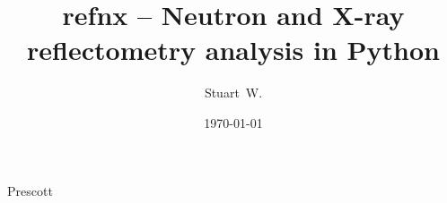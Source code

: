 \documentclass[pdf,preprint]{iucr}
\begin{document}
\title{refnx -- Neutron and X-ray reflectometry analysis in Python}
\author[b]{Stuart~W.}{Prescott}


\date{\today}

\newcommand{\refnx}{\emph{refnx}}
\newcommand{\Objective}{\textbf{Objective}}
\newcommand{\GlobalObjective}{\textbf{GlobalObjective}}
\newcommand{\Parameter}{\textbf{Parameter}}
\newcommand{\Structure}{\textbf{Structure}}
\newcommand{\Slab}{\textbf{Slab}}
\newcommand{\Component}{\textbf{Component}}
\newcommand{\LipidLeaflet}{\textbf{LipidLeaflet}}
\newcommand{\Transform}{\textbf{Transform}}
\newcommand{\DataD}{\textbf{Data1D}}
\newcommand{\ReflectModel}{\textbf{ReflectModel}}
\newcommand{\CurveFitter}{\textbf{CurveFitter}}
\newcommand{\Spline}{\textbf{Spline}}
\newcommand{\conda}{\emph{conda}}
\newcommand{\corner}{\emph{corner}}
\newcommand{\MixedReflectModel}{\textbf{MixedReflectModel}}
\newcommand{\pip}{\emph{pip}}
\newcommand{\emcee}{\emph{emcee}}
\newcommand{\ptemcee}{\emph{ptemcee}}
\newcommand{\NumPy}{\emph{NumPy}}
\newcommand{\SciPy}{\emph{SciPy}}
\newcommand{\Cython}{\emph{Cython}}
\newcommand{\Jupyter}{\emph{Jupyter}}
\newcommand{\ipywidgets}{\emph{ipywidgets}}

\maketitle


\begin{synopsis}
\end{synopsis}

\end{document}
